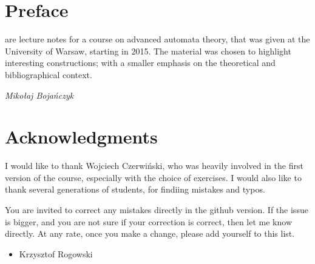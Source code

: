 \documentclass[b5paper,11pt]{book}
\begin{document}
\chapter*{Preface}%
{  \raggedright
{} are lecture notes for a course on advanced automata theory, that was given at the University of Warsaw, starting in 2015.  
The material was chosen to highlight interesting constructions; with a smaller emphasis on  the theoretical and bibliographical context.  




\bigskip
{\slshape  \noindent Miko{\l}aj Boja\'nczyk}


\cleardoublepage

%      
\chapter*{Acknowledgments}%
{  \raggedright
I would like to thank Wojciech Czerwi\'nski, who was heavily involved in the first version of the course, especially with the choice of exercises. I would also like to thank several generations of students, for findiing mistakes and typos.

You are invited to correct any mistakes directly in the github version. If the issue is bigger, and you are not sure if your correction is correct, then let me know directly. At any rate, once you make a change, please add yourself to this list. 

\begin{itemize}
    \item Krzysztof Rogowski
\end{itemize}




\cleardoublepage


%      
\tableofcontents
\thispagestyle{empty}

\mainmatter   %
\pagestyle{fancy}

\newcommand{\rozdzial}[2]{ 
\chapter{#1}
\seclabel{sec:#2}
\secintro{}

}

\newcommand{\bookcontent}{
\rozdzial{Determinisation of $\omega$-automata}{determinisation}
\rozdzial{Infinite duration games}{buchi-landweber}	
\rozdzial{Parity games in quasipolynomial time}{quasipol}
\rozdzial{Distance automata}{distance-automata}
\rozdzial{Monadic second-order logic}{tree-aut}
\rozdzial{Treewidth}{courcelle}
\rozdzial{Weighted automata over a field}{linear-automata}
\rozdzial{Vector addition systems}{wqo}
\rozdzial{Presburger arithmetic}{presburger}
\rozdzial{First-order theory of the reals}{tarski}
\rozdzial{Polynomial grammars}{hilbert}
\rozdzial{Parsing in matrix multiplication time}{valiant}
\rozdzial{Two-way transducers}{two-way}
\rozdzial{Streaming string transducers}{sst}
\rozdzial{Learning automata}{angluin}
}

}}
\end{document}
